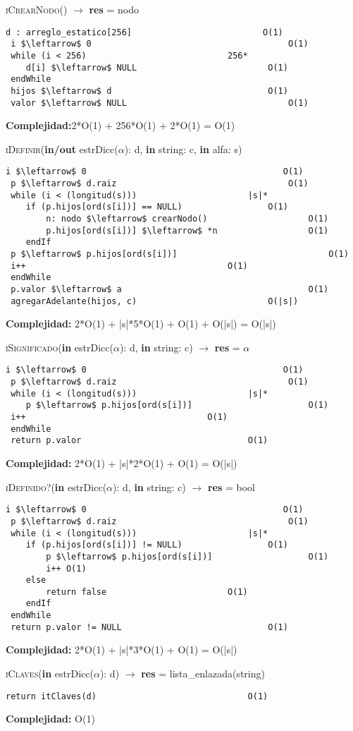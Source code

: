 \textsc{iCrearNodo}() $\rightarrow$ \textbf{res} = nodo
\begin{lstlisting}[mathescape]
 d : arreglo_estatico[256] 							O(1)
 i $\leftarrow$ 0 										O(1)
 while (i < 256) 							256*
 	d[i] $\leftarrow$ NULL 							O(1)
 endWhile
 hijos $\leftarrow$ d 								O(1)
 valor $\leftarrow$ NULL 								O(1)
\end{lstlisting}
\textbf{Complejidad:}2*O(1) + 256*O(1) + 2*O(1) = O(1)

\textsc{iDefinir}(\textbf{in/out} estrDicc($\alpha$): d, \textbf{in} string: c, \textbf{in} alfa: s)
\begin{lstlisting}[mathescape]
 i $\leftarrow$ 0 										O(1)
 p $\leftarrow$ d.raiz 									O(1)
 while (i < (longitud(s))) 						|s|*
 	if (p.hijos[ord(s[i])] == NULL) 				O(1)
		n: nodo $\leftarrow$ crearNodo() 					O(1)
		p.hijos[ord(s[i])] $\leftarrow$ *n 					O(1)
	endIf
 p $\leftarrow$ p.hijos[ord(s[i])] 								O(1)
 i++ 										O(1)
 endWhile
 p.valor $\leftarrow$ a 									O(1)
 agregarAdelante(hijos, c) 							O(|s|)
\end{lstlisting}
\textbf{Complejidad:} 2*O(1) + |s|*5*O(1) + O(1) + O(|s|) = O(|s|)

\textsc{iSignificado}(\textbf{in} estrDicc($\alpha$): d, \textbf{in} string: c) $\rightarrow$ \textbf{res} = $\alpha$
\begin{lstlisting}[mathescape]
 i $\leftarrow$ 0 										O(1)
 p $\leftarrow$ d.raiz 									O(1)
 while (i < (longitud(s))) 						|s|*
	p $\leftarrow$ p.hijos[ord(s[i])] 						O(1)
 i++ 									O(1)
 endWhile
 return p.valor 								O(1)
\end{lstlisting}
\textbf{Complejidad:} 2*O(1) + |s|*2*O(1) + O(1) = O(|s|)

\textsc{iDefinido?}(\textbf{in} estrDicc($\alpha$): d, \textbf{in} string: c) $\rightarrow$ \textbf{res} = bool
\begin{lstlisting}[mathescape]
 i $\leftarrow$ 0 										O(1)
 p $\leftarrow$ d.raiz 									O(1)
 while (i < (longitud(s))) 						|s|*
 	if (p.hijos[ord(s[i])] != NULL) 				O(1)
		p $\leftarrow$ p.hijos[ord(s[i])] 					O(1)
		i++ O(1)
	else
		return false 						O(1)
	endIf
 endWhile
 return p.valor != NULL 							O(1)
\end{lstlisting}
\textbf{Complejidad:} 2*O(1) + |s|*3*O(1) + O(1) = O(|s|)

\textsc{iClaves}(\textbf{in} estrDicc($\alpha$): d) $\rightarrow$ \textbf{res} = lista\_enlazada(string)
\begin{lstlisting}[mathescape]
return itClaves(d)								O(1)
\end{lstlisting}
\textbf{Complejidad:} O(1)

